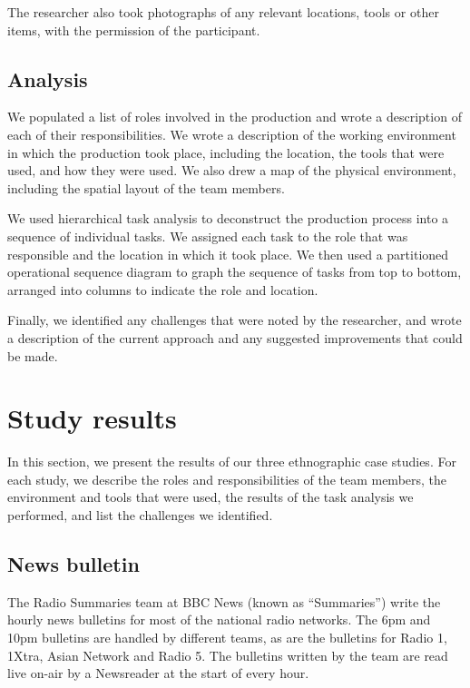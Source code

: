 The researcher also took photographs of any relevant locations, tools or other items, with the permission of the
participant.

\subsection{Analysis}

We populated a list of roles involved in the production and wrote a description of each of their responsibilities. We
wrote a description of the working environment in which the production took place, including the location, the tools
that were used, and how they were used. We also drew a map of the physical environment, including the spatial layout of
the team members.

We used hierarchical task analysis \citep{Kirwan1992,Annett2000} to deconstruct the production process into a sequence
of individual tasks. We assigned each task to the role that was responsible and the location in which it took
place. We then used a partitioned operational sequence diagram \citep{Kirwan1992} to graph the sequence of tasks from
top to bottom, arranged into columns to indicate the role and location.

Finally, we identified any challenges that were noted by the researcher, and wrote a description of the current
approach and any suggested improvements that could be made.

\section{Study results}\label{sec:ethno-results}

In this section, we present the results of our three ethnographic case studies. For each study, we describe the roles
and responsibilities of the team members, the environment and tools that were used, the results of the task analysis we
performed, and list the challenges we identified.


\subsection{News bulletin}\label{sec:news}
The Radio Summaries team at BBC News (known as ``Summaries'') write the hourly news bulletins for most of the national
radio networks. The 6pm and 10pm bulletins are handled by different teams, as are the bulletins for Radio 1, 1Xtra,
Asian Network and Radio 5.  The bulletins written by the team are read live on-air by a Newsreader at the start of
every hour.

